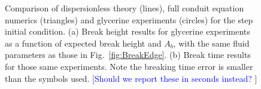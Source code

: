 \documentclass{jfm}
\newcommand{\MM}[1]{[\textcolor{blue}{#1 }]}
\begin{document}
    \begin{figure}
    \centering
    \caption{Comparison of dispersionless theory (lines), full conduit equation numerics (triangles) and glycerine experiments (circles) for the step initial condition. (a) Break height results for glycerine experiments as a function of expected break height and $A_b$, with the same fluid parameters as those in Fig.~\ref{fig:BreakEdge}. (b) Break time results for those same experiments. Note the breaking time error is smaller than the symbols used. \MM{Should we report these in seconds instead?}}
    \label{fig:BreakHeightGlycerin}
    \end{figure}
    
    
\end{document}
